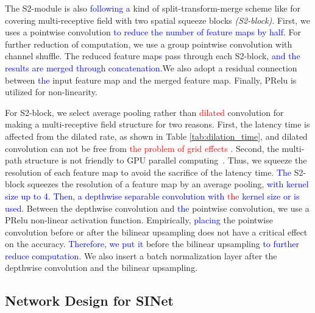 \documentclass[10pt,twocolumn,letterpaper]{article}
\newcommand\Lars[1]{\textcolor{blue}{#1}}
\newcommand\nj[1]{\textcolor{red}{#1}}
\newcommand\Lars[1]{#1}
\newcommand\nj[1]{#1}
\begin{document}
The S2-module is also \Lars{following a} kind of split-transform-merge scheme like \cite{mehta2018espnet, mehta2018espnetv2, park2018concentrated} for covering multi-receptive field with two spatial squeeze blocks \textit{(S2-block)}.
First, we uses a pointwise convolution \Lars{to reduce the number of feature maps by half.}
For further reduction of computation, we use a group pointwise convolution with channel shuffle.
The reduced feature map\Lars{s} pass through each S2-block, \Lars{and the results are merged through concatenation.}We also adopt a residual connection between \Lars{the} input feature map and the merged feature map.
Finally, PRelu is utilized for non-linearity.

For S2-block, we select average pooling rather than \nj{dilated} convolution for making a multi-receptive field structure for two reasons.
First, the latency time is affected from the dilated rate, as shown in Table \ref{tab:dilation_time}, and dilated convolution can not be free from \nj{the problem of grid effects} \cite{park2018concentrated, wang2017understanding}.
Second, the multi-path structure is not friendly to GPU parallel computing~\cite{ma2018shufflenet}. 
Thus, we squeeze the resolution of each feature map to avoid the sacrifice of the latency time. 
\Lars{The} S2-block squeezes the resolution of a feature map by an average pooling\Lars{, with kernel size up to 4}.
\Lars{Then, a depthwise separable convolution with \nj{the} kernel size  or  is used. }
Between the depthwise convolution and \Lars{the} pointwise convolution, we use a PRelu non-linear activation function.
Empirically, \Lars{placing} the pointwise convolution before or after the bilinear upsampling does not have a critical effect on the accuracy.
\Lars{Therefore, we put it }before the bilinear upsampling \Lars{to further reduce computation. }We also insert a batch normalization layer after the depthwise convolution and the bilinear upsampling.











 
\subsection{Network Design for SINet}
\label{SINet}
\end{document}
